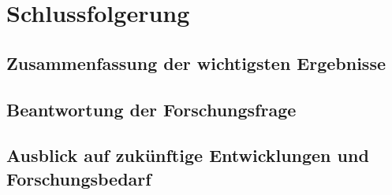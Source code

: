 \section{Schlussfolgerung}
\subsection{Zusammenfassung der wichtigsten Ergebnisse}
\subsection{Beantwortung der Forschungsfrage}
\subsection{Ausblick auf zukünftige Entwicklungen und Forschungsbedarf}